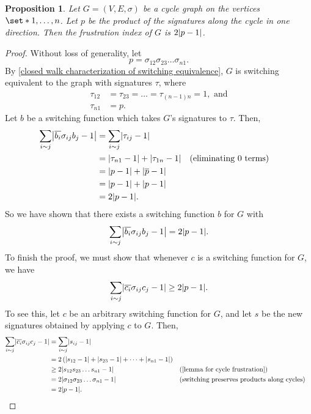 \documentclass[12pt]{article}
\newtheorem{prop}[thm]{Proposition}
\theoremstyle{definition}
\DeclarePairedDelimiter\abs{\lvert}{\rvert}%
\begin{document}
\begin{prop}
Let $G = (V, E, \sigma)$ be a cycle graph on the vertices $\set*{1, \dots, n}$. Let $p$ be the product of the signatures along the cycle in one direction. Then the frustration index of $G$ is $2 \abs*{p - 1}$.
\end{prop}
\begin{proof}
Without loss of generality, let 
$$p=\sigma_{12}\sigma_{23} \dots \sigma_{n1}.$$
By \cref{closed walk characterization of switching equivalence}, $G$ is switching equivalent to the graph with signatures $\tau$, where 
\begin{align*}
\tau_{12} &= \tau_{23} = \dots = \tau_{(n-1)n} = 1, \text{ and} \\
\tau_{n1} &= p.
\end{align*}
Let $b$ be a switching function which takes $G$'s signatures to $\tau$. Then,
\begin{align*}
\sum_{i \sim j} \abs*{\overline{b_i} \sigma_{ij} b_j - 1} 
&= \sum_{i \sim j} \abs*{\tau_{ij} - 1} \\
&= \abs*{\tau_{n1} - 1} + \abs*{\tau_{1n} - 1} && \text{(eliminating 0 terms)} \\
&= \abs*{p - 1} + \abs*{\overline{p} - 1} \\
&= \abs*{p - 1} + \abs*{p - 1} \\
&= 2 \abs*{p - 1}.
\end{align*}
So we have shown that there exists a switching function $b$ for $G$ with 
$$
\sum_{i \sim j} \abs*{\overline{b_i} \sigma_{ij} b_j - 1} = 2 \abs*{p - 1}.
$$ 
To finish the proof, we must show that whenever $c$ is a switching function for $G$, we have
$$
\sum_{i \sim j} \abs*{\overline{c_i} \sigma_{ij} c_j - 1} \geq 2 \abs*{p - 1}.
$$
To see this, let $c$ be an arbitrary switching function for $G$, and let $s$ be the new signatures obtained by applying $c$ to $G$. Then,
\begin{align*}
\sum_{i \sim j} \abs*{\overline{c_i} \sigma_{ij} c_j - 1}
&= \sum_{i \sim j} \abs*{s_{ij} - 1} \\
&= 2 \left( \abs*{s_{12} - 1} + \abs*{s_{23} - 1} + \dots + \abs*{s_{n1} - 1} \right) \\
&\geq 2 \abs*{s_{12} s_{23} \dots s_{n1} - 1} && \text{(\cref{lemma for cycle frustration})} \\
&= 2 \abs*{\sigma_{12} \sigma_{23} \dots \sigma_{n1} - 1} && \text{(switching preserves products along cycles)} \\
&= 2 \abs*{p-1}.
\end{align*}
\end{proof}
\end{document}
